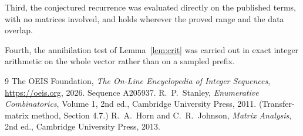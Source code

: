 \documentclass[11pt,a4paper]{article}
\theoremstyle{plain}
\theoremstyle{definition}
\begin{document}
Third, the conjectured recurrence was evaluated directly on the published terms, with no
matrices involved, and holds wherever the proved range and the data overlap.

Fourth, the annihilation test of Lemma~\ref{lem:crit} was carried out in exact integer
arithmetic on the whole vector rather than on a sampled prefix.

\begin{thebibliography}{9}
 The OEIS Foundation, \emph{The On-Line Encyclopedia of Integer
Sequences}, \url{https://oeis.org}, 2026. Sequence A205937.
 R.~P.~Stanley, \emph{Enumerative Combinatorics}, Volume 1, 2nd ed.,
Cambridge University Press, 2011. (Transfer-matrix method, Section 4.7.)
 R.~A.~Horn and C.~R.~Johnson, \emph{Matrix Analysis}, 2nd ed., Cambridge
University Press, 2013.
\end{thebibliography}
\end{document}
